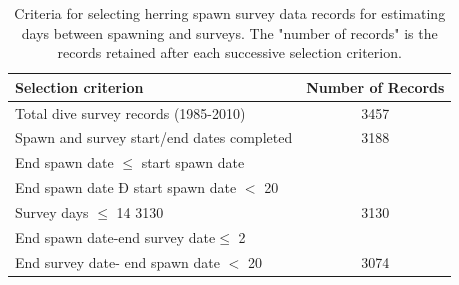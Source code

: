 \begin{table}[htdp]
\caption{Criteria for selecting herring spawn survey data records for estimating days between spawning and surveys. The "number of records" is the records retained after each successive selection criterion. }
\begin{center}
\begin{tabular}{lc}
\hline
Selection criterion	 &Number of Records\\
\hline
Total dive survey records (1985-2010)	&3457\\ \hline
Spawn and survey start/end dates completed &	3188\\ \hline
End spawn date $\leq$ start spawn date &\\
End spawn date Ð start spawn date $<$ 20 &\\
Survey days $\leq$ 14	3130 &  3130\\ \hline
End spawn date-end survey date$\leq$ 2 &\\
End survey date- end spawn date $<$ 20&	3074\\
\hline
\end{tabular}
\end{center}
\label{AppendixC:Table5}
\end{table}%


